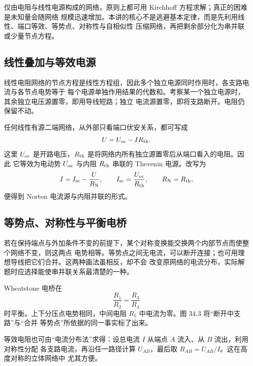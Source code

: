 仅由电阻与线性电源构成的网络，原则上都可用 Kirchhoff 方程求解；真正的困难是未知量会随网络
规模迅速增加。本讲的核心不是逃避基本定律，而是先利用线性、端口等效、等势点、对称性与自相似性
压缩网络，再把剩余部分化为串并联或少量节点方程。

\subsection*{线性叠加与等效电源}

线性电阻网络的节点方程是线性方程组，因此多个独立电源同时作用时，各支路电流与各节点电势等于
每个电源单独作用结果的代数和。考察某一个独立电源时，其余独立电压源置零，即用导线短路；独立
电流源置零，即将支路断开。电阻仍保留不动。

任何线性有源二端网络，从外部只看端口伏安关系，都可写成
\begin{equation}
  U=U_{\rm oc}-IR_{\rm th}.
\end{equation}
这里 $U_{\rm oc}$ 是开路电压，$R_{\rm th}$ 是将网络内所有独立源置零后从端口看入的电阻。因此
它等效为电动势 $U_{\rm oc}$ 与内阻 $R_{\rm th}$ 串联的 Thevenin 电源。改写为
\begin{equation}
  I=I_{\rm sc}-\frac{U}{R_{\rm N}},
  \qquad
  I_{\rm sc}=\frac{U_{\rm oc}}{R_{\rm th}},
  \qquad R_{\rm N}=R_{\rm th},
\end{equation}
便得到 Norton 电流源与内阻并联的形式。

\sourceEquivalentDiagram

\theveninDiagram

\subsection*{等势点、对称性与平衡电桥}

若在保持端点与外加条件不变的前提下，某个对称变换能交换两个内部节点而使整个网络不变，则这两点
电势相等。等势点之间无电流，可以断开连接；也可用理想导线把它们合并。这两种画法虽相反，却不会
改变原网络的电流分布，实际解题时应选择能使串并联关系最清楚的一种。

Wheatstone 电桥在
\begin{equation}
  \boxed{\frac{R_1}{R_2}=\frac{R_3}{R_4}}
\end{equation}
时平衡。上下分压点电势相同，中间电阻 $R_5$ 中电流为零。图 34.3 将“断开中支路”与“合并
等势点”所依据的同一事实标了出来。

\bridgeDiagram

等效电阻也可由“电流分布法”求得：设总电流 $I$ 从端点 $A$ 流入、从 $B$ 流出，利用对称性分配
各支路电流，再沿任一路径计算 $U_{AB}$，最后取 $R_{AB}=U_{AB}/I$。这在高度对称的立体网络中
尤其方便。

